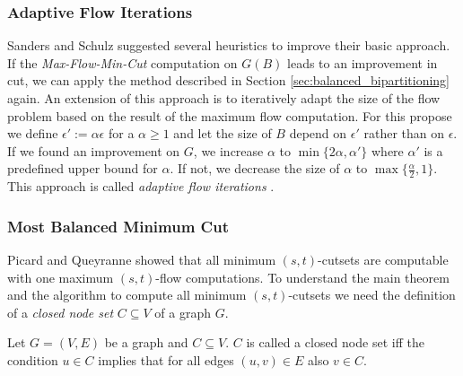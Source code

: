 
\subsubsection{Adaptive Flow Iterations}
\label{sec:adaptive_flow_iterations}

Sanders and Schulz \cite{sanders2011engineering} suggested several heuristics to improve
their basic approach. If the \emph{Max-Flow-Min-Cut} computation on $G(B)$ leads to an
improvement in cut, we can apply the method described in Section 
\ref{sec:balanced_bipartitioning} again. An extension of this approach is to iteratively adapt the
size of the flow problem based on the result of the maximum flow computation. For this propose
we define $\epsilon' := \alpha\epsilon$ for a $\alpha \ge 1$ and let the size of $B$ depend
on $\epsilon'$ rather than on $\epsilon$. If we found an improvement on $G$, we
increase $\alpha$ to $\min\{2\alpha, \alpha'\}$ where $\alpha'$ is a predefined upper bound
for $\alpha$. If not, we decrease the size of $\alpha$ to 
$\max\{\frac{\alpha}{2},1\}$. This approach is called
\emph{adaptive flow iterations} \cite{sanders2011engineering}.

\subsubsection{Most Balanced Minimum Cut}
\label{sec:related_mbmc}

Picard and Queyranne \cite{picard1980structure} showed that all minimum $(s,t)$-cutsets 
are computable with one maximum $(s,t)$-flow computations.
To understand the main theorem and the algorithm to compute all minimum $(s,t)$-cutsets we
need the definition of a \emph{closed node set} $C \subseteq V$ of a graph $G$.

\begin{definition}
Let $G = (V,E)$ be a graph and $C \subseteq V$. $C$ is called a closed node set iff the 
condition $u \in C$ implies that for all edges $(u,v) \in E$ also $v \in C$.
\end{definition}

